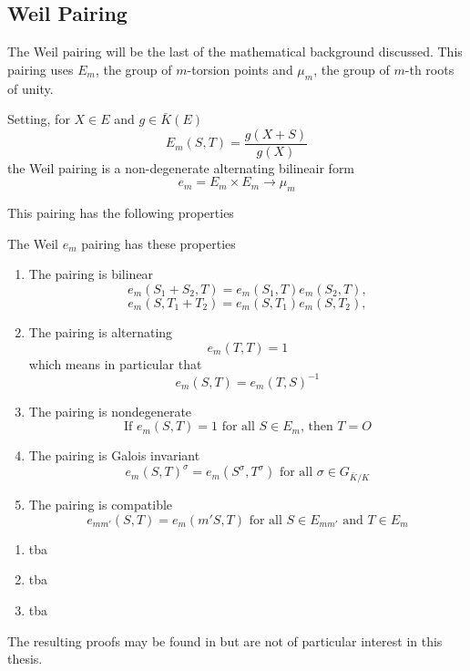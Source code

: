 \subsection{Weil Pairing}
The Weil pairing will be the last of the mathematical background discussed. This pairing uses $E_m$, the group of $m$-torsion points and $\mu_m$, the group of $m$-th roots of unity.
\begin{defn}
	Setting, for $X\in E$ and $g\in\bar{K}(E)$
	\begin{equation*}
	E_m(S,T)=\frac{g(X+S)}{g(X)}
	\end{equation*}
	the Weil pairing is a non-degenerate alternating bilineair form
	\begin{equation*}
	e_m=E_m\times E_m\to\mu_m
	\end{equation*}
\end{defn}
This pairing has the following properties
\begin{thm}
	The Weil $e_m$ pairing has these properties
	\begin{enumerate}
		\item The pairing is bilinear
		\begin{equation*}
		e_m(S_1+S_2,T)=e_m(S_1,T)e_m(S_2,T),
		\end{equation*}
		\begin{equation*}
		e_m(S,T_1+T_2)=e_m(S,T_1)e_m(S,T_2),
		\end{equation*}
		\item The pairing is alternating
		\begin{equation*}
		e_m(T,T)=1
		\end{equation*}
		which means in particular that
		\begin{equation*}
		e_m(S,T)=e_m(T,S)^{-1}
		\end{equation*}
		\item The pairing is nondegenerate
		\begin{equation*}
		\text{If } e_m(S,T)=1\text{ for all } S\in E_m\text{, then } T=O
		\end{equation*}
		\item The pairing is Galois invariant
		\begin{equation*}
		e_m(S,T)^\sigma=e_m(S^\sigma,T^\sigma)\text{ for all }\sigma\in G_{\bar{K}/K}
		\end{equation*}
		\item The pairing is compatible
		\begin{equation*}
		e_{mm'}(S,T)=e_m(m'S,T)\text{ for all }S\in E_{mm'}\text{ and }T\in E_m
		\end{equation*}
	\end{enumerate}
\end{thm}

\begin{prf}
	\begin{enumerate}
		\item tba
		\item tba
		\item tba
	\end{enumerate}
\end{prf}
The resulting proofs may be found in \cite[page 96]{EllipticCurvesBook} but are not of particular interest in this thesis.